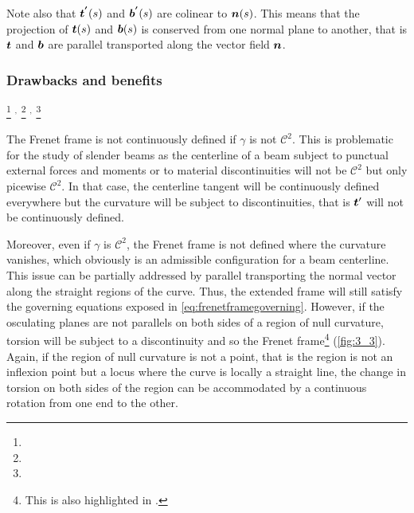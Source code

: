 Note also that $\boldsymbol{t^{'}}(s)$ and $\boldsymbol{b^{'}}(s)$ are colinear to $\boldsymbol{n}(s)$. This means that the projection of $\boldsymbol{t}(s)$ and $\boldsymbol{b}(s)$ is conserved from one normal plane to another, that is $\boldsymbol{t}$ and $\boldsymbol{b}$ are parallel transported along the vector field $\boldsymbol{n}$.

\subsubsection{Drawbacks and benefits}\label{sec:frenetdrawbacks}
\footnote{}
${}^,$
\footnote{}
${}^,$
\footnote{}

The Frenet frame is not continuously defined if $\gamma$ is not $\mathcal{C}^2$. This is problematic for the study of slender beams as the centerline of a beam subject to punctual external forces and moments or to material discontinuities will not be $\mathcal{C}^2$ but only picewise $\mathcal{C}^2$. In that case, the centerline tangent will be continuously defined everywhere but the curvature will be subject to discontinuities, that is $\boldsymbol{t}'$ will not be continuously defined.

Moreover, even if $\gamma$ is $\mathcal{C}^2$, the Frenet frame is not defined where the curvature vanishes, which obviously is an admissible configuration for a beam centerline. This issue can be partially addressed by parallel transporting the normal vector along the straight regions of the curve. Thus, the extended frame will still satisfy the governing equations exposed in \cref{eq:frenetframegoverning}. However, if the osculating planes are not parallels on both sides of a region of null curvature, torsion will be subject to a discontinuity and so the Frenet frame\footnote{This is also highlighted in \cite{Bloomenthal1990, Wang2008}.} (\cref{fig:3_3}). Again, if the region of null curvature is not a point, that is the region is not an inflexion point but a locus where the curve is locally a straight line, the change in torsion on both sides of the region can be accommodated by a continuous rotation from one end to the other.

